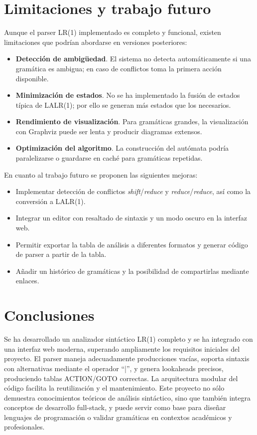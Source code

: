 \documentclass[12pt,a4paper]{article}
\begin{document}
\section{Limitaciones y trabajo futuro}

Aunque el parser LR(1) implementado es completo y funcional, existen limitaciones que podrían abordarse en versiones posteriores:
\begin{itemize}
  \item \textbf{Detección de ambigüedad}.  El sistema no detecta automáticamente si una gramática es ambigua; en caso de conflictos toma la primera acción disponible.
  \item \textbf{Minimización de estados}.  No se ha implementado la fusión de estados típica de LALR(1); por ello se generan más estados que los necesarios.
  \item \textbf{Rendimiento de visualización}.  Para gramáticas grandes, la visualización con Graphviz puede ser lenta y producir diagramas extensos.
  \item \textbf{Optimización del algoritmo}.  La construcción del autómata podría paralelizarse o guardarse en caché para gramáticas repetidas.
\end{itemize}

En cuanto al trabajo futuro se proponen las siguientes mejoras:
\begin{itemize}
  \item Implementar detección de conflictos \emph{shift}/\emph{reduce} y \emph{reduce}/\emph{reduce}, así como la conversión a LALR(1).
  \item Integrar un editor con resaltado de sintaxis y un modo oscuro en la interfaz web.
  \item Permitir exportar la tabla de análisis a diferentes formatos y generar código de parser a partir de la tabla.
  \item Añadir un histórico de gramáticas y la posibilidad de compartirlas mediante enlaces.
\end{itemize}

\section{Conclusiones}

Se ha desarrollado un analizador sintáctico LR(1) completo y se ha integrado con una interfaz web moderna, superando ampliamente los requisitos iniciales del proyecto.  El parser maneja adecuadamente producciones vacías, soporta sintaxis con alternativas mediante el operador ``|'', y genera lookaheads precisos, produciendo tablas ACTION/GOTO correctas.  La arquitectura modular del código facilita la reutilización y el mantenimiento.  Este proyecto no sólo demuestra conocimientos teóricos de análisis sintáctico, sino que también integra conceptos de desarrollo full-stack, y puede servir como base para diseñar lenguajes de programación o validar gramáticas en contextos académicos y profesionales.
\end{document}
